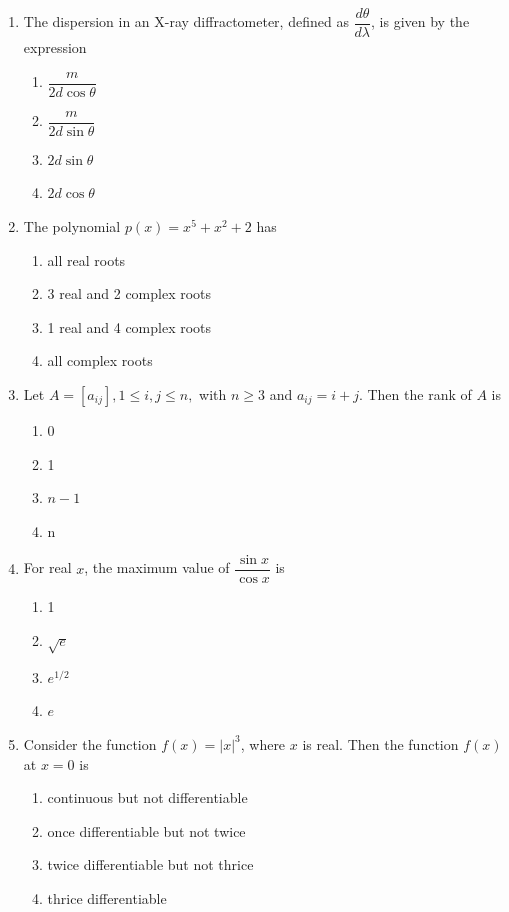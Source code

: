 \documentclass[journal]{IEEEtran}
\begin{document}
\begin{enumerate}
\item The dispersion in an X-ray diffractometer, defined as $\dfrac{d\theta}{d\lambda}$, is given by the expression  
\begin{multicols}{4}
\begin{enumerate}
\item $\dfrac{m}{2d \cos \theta}$  
\item $\dfrac{m}{2d \sin \theta}$  
\item $2d \sin \theta$  
\item $2d \cos \theta$  
\end{enumerate}
\end{multicols}


\item The polynomial $p(x) = x^5 + x^2 + 2$ has  
\begin{multicols}{2}
\begin{enumerate}
\item all real roots  
\item 3 real and 2 complex roots  
\item 1 real and 4 complex roots  
\item all complex roots  
\end{enumerate}
\end{multicols}


\item Let $A = [a_{ij}], 1 \leq i,j \leq n,$ with $n \geq 3$ and $a_{ij} = i+j$. Then the rank of $A$ is  
	\begin{multicols}{4}
\begin{enumerate}
\item 0  
\item 1  
\item $n-1$  
\item n  
\end{enumerate}
\end{multicols}


\item For real $x$, the maximum value of $\dfrac{\sin x}{\cos x}$ is  
\begin{multicols}{4}
\begin{enumerate}
\item 1  
\item $\sqrt{e}$  
\item $e^{1/2}$  
\item $e$  
\end{enumerate}
\end{multicols}


\item Consider the function $f(x) = |x|^3$, where $x$ is real. Then the function $f(x)$ at $x=0$ is 
\begin{enumerate}
\item continuous but not differentiable  
\item once differentiable but not twice  
\item twice differentiable but not thrice  
\item thrice differentiable  
\end{enumerate}



\end{enumerate}
\end{document}
